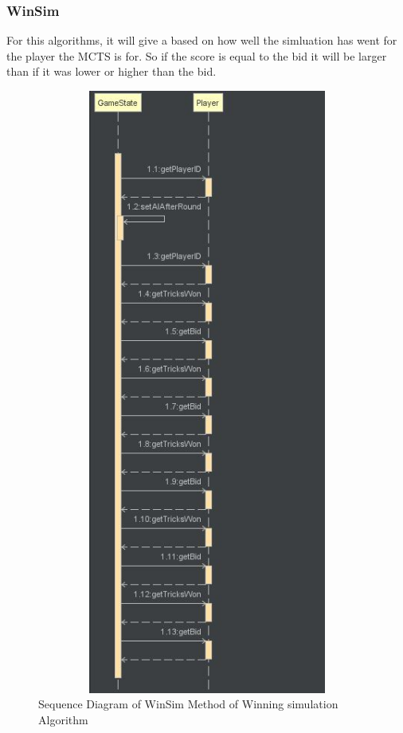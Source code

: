 \subsubsection{WinSim}
For this algorithms, it will give a based on how well the simluation has went for the player the MCTS is for. So if the score is equal to the bid it will be larger than if it was lower or higher than the bid.
\begin{figure}
\centering
\includegraphics[width=15cm ,height=20cm,keepaspectratio]{WinSimSequenceDiagram}
\caption{Sequence Diagram of WinSim Method of Winning simulation Algorithm }
\label{fig:WinSim}
\end{figure}
